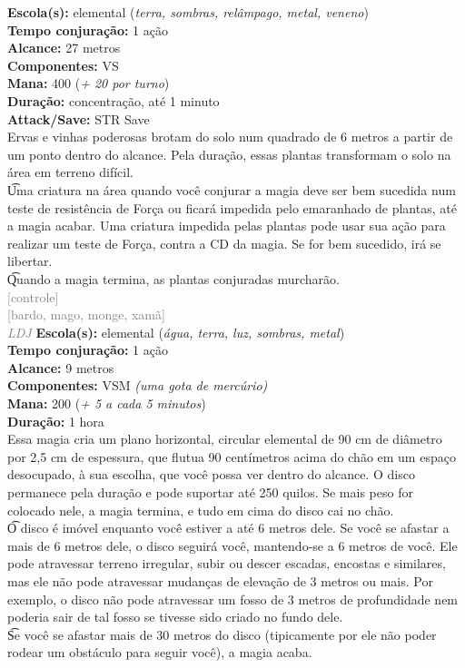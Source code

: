 \documentclass{RPG_Adventure}[2021/10/20]
\begin{document}
{\small \t \textbf{Escola(s):} elemental (\textit{terra, sombras, relâmpago, metal, veneno})\\\t \textbf{Tempo conjuração:} 1 ação\\\t \textbf{Alcance:} 27 metros\\\t \textbf{Componentes:} VS\\\t \textbf{Mana:} 400 (\textit{+ 20 por turno})\\\t \textbf{Duração:} concentração, até 1 minuto\\\t \textbf{Attack/Save:} STR Save\\}
{\normalsize Ervas e vinhas poderosas brotam do solo num quadrado de 6 metros a partir de um ponto dentro do alcance. Pela duração, essas plantas transformam o solo na área em terreno difícil.\\\t Uma criatura na área quando você conjurar a magia deve ser bem sucedida num teste de resistência de Força ou ficará impedida pelo emaranhado de plantas, até a magia acabar. Uma criatura impedida pelas plantas pode usar sua ação para realizar um teste de Força, contra a CD da magia. Se for bem sucedido, irá se libertar.\\\t Quando a magia termina, as plantas conjuradas murcharão.\\}
{\scriptsize \textcolor{gray}{[controle]\\}}
{\scriptsize \textcolor{gray}{[bardo, mago, monge, xamã]\\}}
{\tiny \textcolor{gray}{\textit{LDJ}}}\jump{}
{\small \t \textbf{Escola(s):} elemental (\textit{água, terra, luz, sombras, metal})\\\t \textbf{Tempo conjuração:} 1 ação\\\t \textbf{Alcance:} 9 metros\\\t \textbf{Componentes:} VSM \textit{(uma gota de mercúrio)}\\\t \textbf{Mana:} 200 (\textit{+ 5 a cada 5 minutos})\\\t \textbf{Duração:} 1 hora\\}
{\normalsize Essa magia cria um plano horizontal, circular elemental de 90 cm de diâmetro por 2,5 cm de espessura, que flutua 90 centímetros acima do chão em um espaço desocupado, à sua escolha, que você possa ver dentro do alcance. O disco permanece pela duração e pode suportar até 250 quilos. Se mais peso for colocado nele, a magia termina, e tudo em cima do disco cai no chão.\\\t O disco é imóvel enquanto você estiver a até 6 metros dele. Se você se afastar a mais de 6 metros dele, o disco seguirá você, mantendo-se a 6 metros de você. Ele pode atravessar terreno irregular, subir ou descer escadas, encostas e similares, mas ele não pode atravessar mudanças de elevação de 3 metros ou mais. Por exemplo, o disco não pode atravessar um fosso de 3 metros de profundidade nem poderia sair de tal fosso se tivesse sido criado no fundo dele.\\\t Se você se afastar mais de 30 metros do disco (tipicamente por ele não poder rodear um obstáculo para seguir você), a magia acaba.\\}
\end{document}
